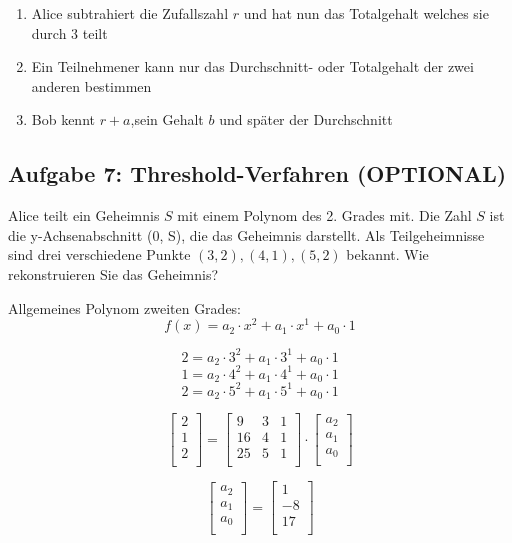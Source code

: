 \documentclass[11pt]{article}
\providecommand{\tightlist}{%
      \setlength{\itemsep}{0pt}\setlength{\parskip}{0pt}}
\begin{document}
    \begin{enumerate}
\def\labelenumi{\arabic{enumi}.}
\tightlist
\item
  Alice subtrahiert die Zufallszahl \(r\) und hat nun das Totalgehalt
  welches sie durch 3 teilt
\item
  Ein Teilnehmener kann nur das Durchschnitt- oder Totalgehalt der zwei
  anderen bestimmen
\item
  Bob kennt \(r+a\),sein Gehalt \(b\) und später der Durchschnitt
\end{enumerate}

    \subsection{Aufgabe 7: Threshold-Verfahren
(OPTIONAL)}\label{aufgabe-7-threshold-verfahren-optional}

    Alice teilt ein Geheimnis \(S\) mit einem Polynom des 2. Grades mit. Die
Zahl \(S\) ist die y-Achsenabschnitt (0, S), die das Geheimnis
darstellt. Als Teilgeheimnisse sind drei verschiedene Punkte
\((3, 2), (4, 1), (5, 2)\) bekannt. Wie rekonstruieren Sie das
Geheimnis?

    Allgemeines Polynom zweiten Grades:
\[f(x) = a_2\cdot x^2 + a_1\cdot x^1 + a_0\cdot 1\]

\[ 2 = a_2\cdot 3^2 + a_1\cdot 3^1 + a_0\cdot 1\]
\[ 1 = a_2\cdot 4^2 + a_1\cdot 4^1 + a_0\cdot 1\]
\[ 2 = a_2\cdot 5^2 + a_1\cdot 5^1 + a_0\cdot 1\]

\[
\begin{bmatrix}
2\\
1\\
2\\
\end{bmatrix}
=
\begin{bmatrix}
9 & 3 & 1\\
16 & 4 & 1\\
25 & 5 & 1\\
\end{bmatrix}
\cdot
\begin{bmatrix}
a_2\\
a_1\\
a_0\\
\end{bmatrix}
\]

\[
\begin{bmatrix}
a_2\\
a_1\\
a_0\\
\end{bmatrix}
=
\begin{bmatrix}
1\\
-8\\
17\\
\end{bmatrix}
\]
\end{document}
